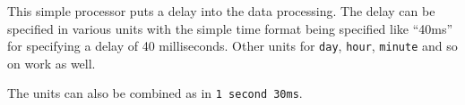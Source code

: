 
This simple processor puts a delay into the data processing. The delay
can be specified in various units with the simple time format being
specified like ``{\ttfamily 40ms}'' for specifying a delay of 40
milliseconds. Other units for \texttt{day}, \texttt{hour},
\texttt{minute} and so on work as well.

The units can also be combined as in \texttt{1 second 30ms}.

